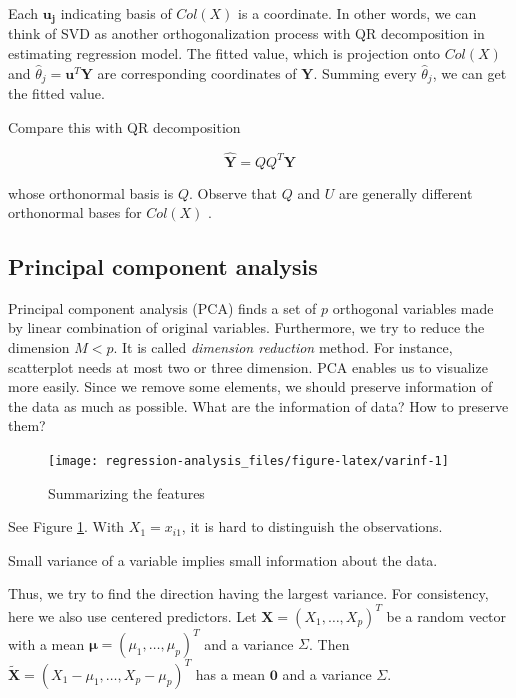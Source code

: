\documentclass[]{book}
\theoremstyle{definition}
\theoremstyle{definition}
\theoremstyle{definition}
\theoremstyle{remark}
\let\BeginKnitrBlock\begin \let\EndKnitrBlock\end
\begin{document}
Each \(\mathbf{u_j}\) indicating basis of \(Col(X)\) is a coordinate. In other words, we can think of SVD as another orthogonalization process with QR decomposition in estimating regression model. The fitted value, which is projection onto \(Col(X)\) and \(\hat\theta_j = \mathbf{u}^T \mathbf{Y}\) are corresponding coordinates of \(\mathbf{Y}\). Summing every \(\hat\theta_j\), we can get the fitted value.

Compare this with QR decomposition

\[\hat{\mathbf{Y}} = Q Q^T \mathbf{Y}\]

whose orthonormal basis is \(Q\). Observe that \(Q\) and \(U\) are generally different orthonormal bases for \(Col(X)\) \citep{Hastie:2013aa}.

\hypertarget{principal-component-analysis-1}{%
\subsection{Principal component analysis}\label{principal-component-analysis-1}}

Principal component analysis (PCA) finds a set of \(p\) orthogonal variables made by linear combination of original variables. Furthermore, we try to reduce the dimension \(M < p\). It is called \emph{dimension reduction} method. For instance, scatterplot needs at most two or three dimension. PCA enables us to visualize more easily. Since we remove some elements, we should preserve information of the data as much as possible. What are the information of data? How to preserve them?

\begin{figure}[H]

{\centering \texttt{[image: regression-analysis\_files/figure-latex/varinf-1]} 

}

\caption{Summarizing the features}\label{fig:varinf}
\end{figure}

See Figure \ref{fig:varinf}. With \(X_1 = x_{i1}\), it is hard to distinguish the observations.

\BeginKnitrBlock{conjecture}
\protect\hypertarget{cnj:varinf2}{}{\label{cnj:varinf2} }Small variance of a variable implies small information about the data.
\EndKnitrBlock{conjecture}

Thus, we try to find the direction having the largest variance. For consistency, here we also use centered predictors. Let \(\mathbf{X} = (X_1, \ldots, X_p)^T\) be a random vector with a mean \(\boldsymbol\mu = (\mu_1, \ldots, \mu_p)^T\) and a variance \(\Sigma\). Then \(\widetilde{\mathbf{X}} = (X_1 - \mu_1, \ldots, X_p - \mu_p)^T\) has a mean \(\mathbf{0}\) and a variance \(\Sigma\).
\end{document}
